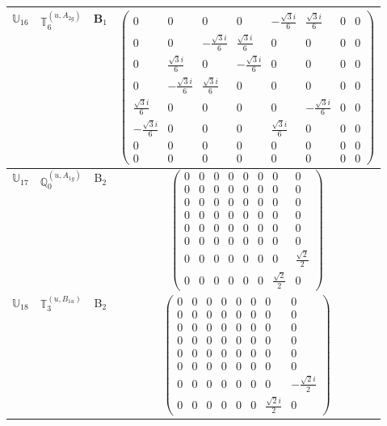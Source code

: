 \documentclass[fleqn,10pt,landscape]{article}
\begin{document}
\begin{itemize}
\begin{center}
\begin{longtable}{c|c|c|c}
$ \mathbb{U}_{16} $ & $\mathbb{T}_{6}^{(u,A_{2g})}$ & B$_{1}$ & $\begin{pmatrix} 0 & 0 & 0 & 0 & - \frac{\sqrt{3} i}{6} & \frac{\sqrt{3} i}{6} & 0 & 0 \\ 0 & 0 & - \frac{\sqrt{3} i}{6} & \frac{\sqrt{3} i}{6} & 0 & 0 & 0 & 0 \\ 0 & \frac{\sqrt{3} i}{6} & 0 & - \frac{\sqrt{3} i}{6} & 0 & 0 & 0 & 0 \\ 0 & - \frac{\sqrt{3} i}{6} & \frac{\sqrt{3} i}{6} & 0 & 0 & 0 & 0 & 0 \\ \frac{\sqrt{3} i}{6} & 0 & 0 & 0 & 0 & - \frac{\sqrt{3} i}{6} & 0 & 0 \\ - \frac{\sqrt{3} i}{6} & 0 & 0 & 0 & \frac{\sqrt{3} i}{6} & 0 & 0 & 0 \\ 0 & 0 & 0 & 0 & 0 & 0 & 0 & 0 \\ 0 & 0 & 0 & 0 & 0 & 0 & 0 & 0 \end{pmatrix}$ \\ \hline
$ \mathbb{U}_{17} $ & $\mathbb{Q}_{0}^{(u,A_{1g})}$ & B$_{2}$ & $\begin{pmatrix} 0 & 0 & 0 & 0 & 0 & 0 & 0 & 0 \\ 0 & 0 & 0 & 0 & 0 & 0 & 0 & 0 \\ 0 & 0 & 0 & 0 & 0 & 0 & 0 & 0 \\ 0 & 0 & 0 & 0 & 0 & 0 & 0 & 0 \\ 0 & 0 & 0 & 0 & 0 & 0 & 0 & 0 \\ 0 & 0 & 0 & 0 & 0 & 0 & 0 & 0 \\ 0 & 0 & 0 & 0 & 0 & 0 & 0 & \frac{\sqrt{2}}{2} \\ 0 & 0 & 0 & 0 & 0 & 0 & \frac{\sqrt{2}}{2} & 0 \end{pmatrix}$ \\
$ \mathbb{U}_{18} $ & $\mathbb{T}_{3}^{(u,B_{1u})}$ & B$_{2}$ & $\begin{pmatrix} 0 & 0 & 0 & 0 & 0 & 0 & 0 & 0 \\ 0 & 0 & 0 & 0 & 0 & 0 & 0 & 0 \\ 0 & 0 & 0 & 0 & 0 & 0 & 0 & 0 \\ 0 & 0 & 0 & 0 & 0 & 0 & 0 & 0 \\ 0 & 0 & 0 & 0 & 0 & 0 & 0 & 0 \\ 0 & 0 & 0 & 0 & 0 & 0 & 0 & 0 \\ 0 & 0 & 0 & 0 & 0 & 0 & 0 & - \frac{\sqrt{2} i}{2} \\ 0 & 0 & 0 & 0 & 0 & 0 & \frac{\sqrt{2} i}{2} & 0 \end{pmatrix}$ \\ \hline

\end{longtable}
\end{center}
\end{itemize}
\end{document}
